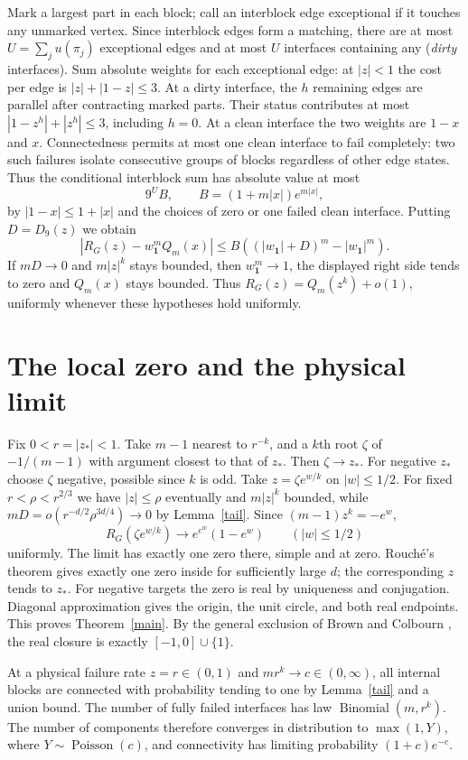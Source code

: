 \documentclass[11pt]{article}
\newcommand{\one}{\boldsymbol{1}}
\begin{document}
Mark a largest part in each block; call an interblock edge exceptional if it touches any unmarked vertex. Since interblock edges form a matching, there are at most $U=\sum_j u(\pi_j)$ exceptional edges and at most $U$ interfaces containing any (\emph{dirty} interfaces). Sum absolute weights for each exceptional edge: at $|z|<1$ the cost per edge is $|z|+|1-z|\le3$. At a dirty interface, the $h$ remaining edges are parallel after contracting marked parts. Their status contributes at most $|1-z^h|+|z^h|\le3$, including $h=0$. At a clean interface the two weights are $1-x$ and $x$. Connectedness permits at most one clean interface to fail completely: two such failures isolate consecutive groups of blocks regardless of other edge states. Thus the conditional interblock sum has absolute value at most
\[
 9^U B,\qquad B=(1+m|x|)e^{m|x|},
\]
by $|1-x|\le1+|x|$ and the choices of zero or one failed clean interface. Putting $D=D_9(z)$ we obtain
\[
 |R_G(z)-w_{\one}^m Q_m(x)|\le
 B\left((|w_{\one}|+D)^m-|w_{\one}|^m\right).
\]
If $mD\to0$ and $m|z|^k$ stays bounded, then $w_{\one}^m\to1$, the displayed right side tends to zero and $Q_m(x)$ stays bounded. Thus $R_G(z)=Q_m(z^k)+o(1)$, uniformly whenever these hypotheses hold uniformly.

\section{The local zero and the physical limit}
Fix $0<r=|z_*|<1$. Take $m-1$ nearest to $r^{-k}$, and a $k$th root $\zeta$ of $-1/(m-1)$ with argument closest to that of $z_*$. Then $\zeta\to z_*$. For negative $z_*$ choose $\zeta$ negative, possible since $k$ is odd. Take $z=\zeta e^{w/k}$ on $|w|\le1/2$. For fixed $r<\rho<r^{2/3}$ we have $|z|\le\rho$ eventually and $m|z|^k$ bounded, while $mD=o(r^{-d/2}\rho^{3d/4})\to0$ by Lemma~\ref{tail}. Since $(m-1)z^k=-e^w$,
\[
  R_G(\zeta e^{w/k})\longrightarrow e^{e^w}(1-e^w)
       \qquad (|w|\le1/2)
\]
uniformly. The limit has exactly one zero there, simple and at zero. Rouch\'e's theorem gives exactly one zero inside for sufficiently large $d$; the corresponding $z$ tends to $z_*$. For negative targets the zero is real by uniqueness and conjugation. Diagonal approximation gives the origin, the unit circle, and both real endpoints. This proves Theorem~\ref{main}. By the general exclusion of Brown and Colbourn \cite[Corollary 3.2]{BC}, the real closure is exactly $[-1,0]\cup\{1\}$.

At a physical failure rate $z=r\in(0,1)$ and $mr^k\to c\in(0,\infty)$, all internal blocks are connected with probability tending to one by Lemma~\ref{tail} and a union bound. The number of fully failed interfaces has law $\operatorname{Binomial}(m,r^k)$. The number of components therefore converges in distribution to $\max(1,Y)$, where $Y\sim\operatorname{Poisson}(c)$, and connectivity has limiting probability $(1+c)e^{-c}$.
\end{document}
